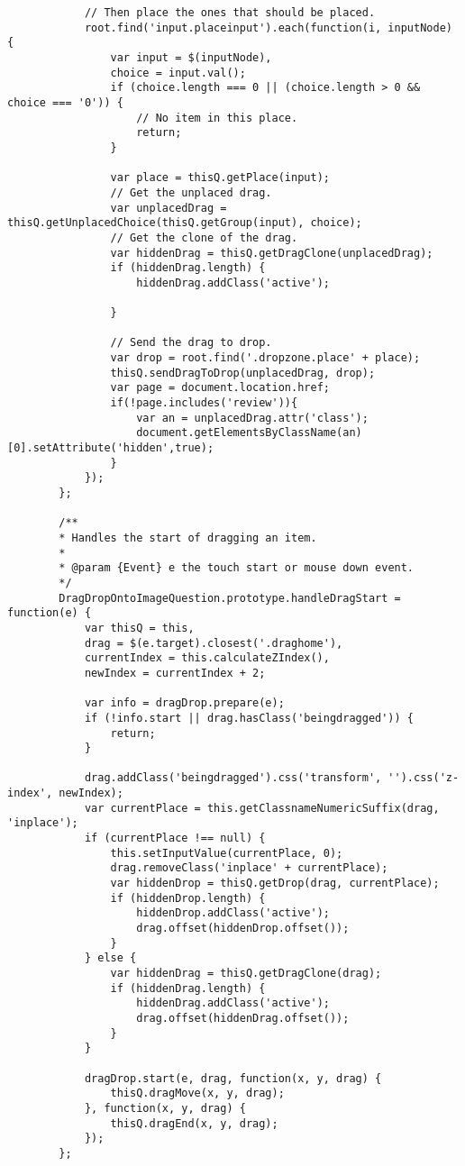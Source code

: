 \begin{lstlisting}
			// Then place the ones that should be placed.
			root.find('input.placeinput').each(function(i, inputNode) {
				var input = $(inputNode),
				choice = input.val();
				if (choice.length === 0 || (choice.length > 0 && choice === '0')) {
					// No item in this place.
					return;
				}
				
				var place = thisQ.getPlace(input);
				// Get the unplaced drag.
				var unplacedDrag = thisQ.getUnplacedChoice(thisQ.getGroup(input), choice);
				// Get the clone of the drag.
				var hiddenDrag = thisQ.getDragClone(unplacedDrag);
				if (hiddenDrag.length) {
					hiddenDrag.addClass('active');
					
				}
				
				// Send the drag to drop.
				var drop = root.find('.dropzone.place' + place);
				thisQ.sendDragToDrop(unplacedDrag, drop);
				var page = document.location.href;
				if(!page.includes('review')){
					var an = unplacedDrag.attr('class');
					document.getElementsByClassName(an)[0].setAttribute('hidden',true);
				}
			});
		};
		
		/**
		* Handles the start of dragging an item.
		*
		* @param {Event} e the touch start or mouse down event.
		*/
		DragDropOntoImageQuestion.prototype.handleDragStart = function(e) {
			var thisQ = this,
			drag = $(e.target).closest('.draghome'),
			currentIndex = this.calculateZIndex(),
			newIndex = currentIndex + 2;
			
			var info = dragDrop.prepare(e);
			if (!info.start || drag.hasClass('beingdragged')) {
				return;
			}
			
			drag.addClass('beingdragged').css('transform', '').css('z-index', newIndex);
			var currentPlace = this.getClassnameNumericSuffix(drag, 'inplace');
			if (currentPlace !== null) {
				this.setInputValue(currentPlace, 0);
				drag.removeClass('inplace' + currentPlace);
				var hiddenDrop = thisQ.getDrop(drag, currentPlace);
				if (hiddenDrop.length) {
					hiddenDrop.addClass('active');
					drag.offset(hiddenDrop.offset());
				}
			} else {
				var hiddenDrag = thisQ.getDragClone(drag);
				if (hiddenDrag.length) {
					hiddenDrag.addClass('active');
					drag.offset(hiddenDrag.offset());
				}
			}
			
			dragDrop.start(e, drag, function(x, y, drag) {
				thisQ.dragMove(x, y, drag);
			}, function(x, y, drag) {
				thisQ.dragEnd(x, y, drag);
			});
		};
		

\end{lstlisting}
